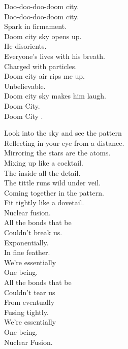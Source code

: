 Doo-doo-doo-doom city. \\
Doo-doo-doo-doom city. \\

Spark in firmament. \\
Doom city sky opens up. \\
He disorients. \\
Everyone's lives with his breath. \\
Charged with particles. \\
Doom city air rips me up. \\
Unbelievable. \\
Doom city sky makes him laugh. \\

Doom City. \\
Doom City . \\




Look into the sky and see the pattern \\
Reflecting in your eye from a distance. \\
Mirroring the stars are the atoms. \\
Mixing up like a cocktail. \\

The  inside all the detail. \\
The tittle runs wild under veil. \\
Coming together in the pattern. \\
Fit tightly like a dovetail. \\

Nuclear fusion. \\

All the bonds that be \\
Couldn't break us. \\
Exponentially. \\
In fine feather. \\
We're essentially \\
One being. \\

All the bonds that be \\
Couldn't tear us \\
From eventually \\
Fusing tightly. \\
We're essentially \\
One being. \\
Nuclear Fusion. \\

